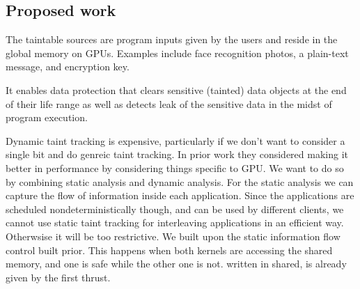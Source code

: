 

\subsection{Proposed work}

The taintable sources are program inputs
given by the users and reside in the global memory
on GPUs. Examples include face recognition photos, a plain-text message, and encryption key.

It enables data protection that clears sensitive (tainted) data objects at the end of their life range as well as detects leak of the sensitive data in the midst of program execution.


Dynamic taint tracking is expensive, particularly if we don't want to consider a single bit and do genreic taint tracking.
% 
In prior work they considered making it better in performance by considering things specific to GPU.
%
We want to do so by combining static analysis and dynamic analysis.
%
For the static analysis we can capture the flow of information inside each application.
%
Since the applications are scheduled nondeterministically though, and can be used by different clients, we cannot use static taint tracking for interleaving applications in an efficient way. Otherwsise it will be too restrictive.
%
We built upon the static information flow control built prior.
This happens when both kernels are accessing the shared memory, and one is safe while the other one is not. written in shared, is already given by the first thrust.



